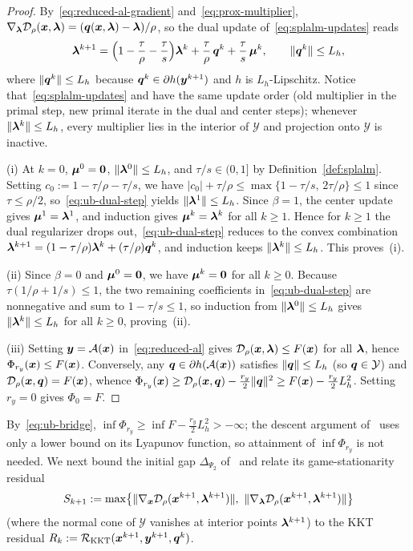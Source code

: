 \begin{proof}
By~\eqref{eq:reduced-al-gradient} and~\eqref{eq:prox-multiplier},
\(\nabla_{\bm{\lambda}}\mathcal{D}_\rho(\bm{x},\bm{\lambda})=(\bm{q}(\bm{x},\bm{\lambda})-\bm{\lambda})/\rho\), so
the dual update of~\eqref{eq:splalm-updates} reads
\begin{equation}
\bm{\lambda}^{k+1}
=\Bigl(1-\frac\tau\rho-\frac\tau s\Bigr)\bm{\lambda}^k
+\frac\tau\rho\,\bm{q}^k+\frac\tau s\,\bm{\mu}^k,
\qquad \|\bm{q}^k\|\le L_h,
\label{eq:ub-dual-step}
\end{equation}
where \(\|\bm{q}^k\|\le L_h\) because \(\bm{q}^k\in\partial h(\bm{y}^{k+1})\) and \(h\)
is \(L_h\)-Lipschitz. Notice that~\eqref{eq:splalm-updates} and
\cite[Algorithm~3]{li2026smoothing} have the same update order (old multiplier
in the primal step, new primal iterate in the dual and center steps); whenever
\(\|\bm{\lambda}^k\|\le L_h\), every multiplier lies in the interior of \(\mathcal Y\)
and projection onto \(\mathcal Y\) is inactive.

(i) At \(k=0\), \(\bm{\mu}^0=\bm{0}\), \(\|\bm{\lambda}^0\|\le L_h\), and
\(\tau/s\in(0,1]\) by Definition~\ref{def:splalm}. Setting
\(c_0:=1-\tau/\rho-\tau/s\), we have
\(|c_0|+\tau/\rho\le\max\{1-\tau/s,\,2\tau/\rho\}\le1\) since
\(\tau\le\rho/2\), so~\eqref{eq:ub-dual-step} yields \(\|\bm{\lambda}^1\|\le L_h\).
Since \(\beta=1\), the center update gives \(\bm{\mu}^1=\bm{\lambda}^1\), and induction
gives \(\bm{\mu}^k=\bm{\lambda}^k\) for all \(k\ge1\). Hence for \(k\ge1\) the dual
regularizer drops out,~\eqref{eq:ub-dual-step} reduces to the convex
combination \(\bm{\lambda}^{k+1}=(1-\tau/\rho)\bm{\lambda}^k+(\tau/\rho)\bm{q}^k\), and
induction keeps \(\|\bm{\lambda}^k\|\le L_h\). This proves~(i).

(ii) Since \(\beta=0\) and \(\bm{\mu}^0=\bm{0}\), we have \(\bm{\mu}^k=\bm{0}\) for all
\(k\ge0\). Because \(\tau(1/\rho+1/s)\le1\), the two remaining coefficients
in~\eqref{eq:ub-dual-step} are nonnegative and sum to \(1-\tau/s\le1\), so
induction from \(\|\bm{\lambda}^0\|\le L_h\) gives \(\|\bm{\lambda}^k\|\le L_h\) for all
\(k\ge0\), proving~(ii).

(iii) Setting \(\bm{y}=\mathcal{A}(\bm{x})\) in~\eqref{eq:reduced-al} gives
\(\mathcal{D}_\rho(\bm{x},\bm{\lambda})\le F(\bm{x})\) for all \(\bm{\lambda}\), hence
\(\Phi_{r_y}(\bm{x})\le F(\bm{x})\). Conversely, any \(\bm{q}\in\partial h(\mathcal{A}(\bm{x}))\)
satisfies \(\|\bm{q}\|\le L_h\) (so \(\bm{q}\in\mathcal Y\)) and
\(\mathcal{D}_\rho(\bm{x},\bm{q})=F(\bm{x})\), whence
\(\Phi_{r_y}(\bm{x})\ge\mathcal{D}_\rho(\bm{x},\bm{q})-\frac{r_y}{2}\|\bm{q}\|^2
\ge F(\bm{x})-\frac{r_y}{2}L_h^2\). Setting \(r_y=0\) gives \(\Phi_0=F\).
\end{proof}

By~\eqref{eq:ub-bridge}, \(\inf\Phi_{r_y}\ge\inf F-\frac{r_y}{2}L_h^2>-\infty\);
the descent argument of~\cite[Section~4]{li2026smoothing} uses only a lower
bound on its Lyapunov function, so attainment of \(\inf\Phi_{r_y}\) is not
needed. We next bound the initial gap \(\Delta_{\Psi_2}\)
of~\cite[Definition~3.1(ii)]{li2026smoothing} and relate its game-stationarity
residual
\[
S_{k+1}:=\max\bigl\{\|\nabla_{\bm{x}}\mathcal{D}_\rho(\bm{x}^{k+1},\bm{\lambda}^{k+1})\|,\
\|\nabla_{\bm{\lambda}}\mathcal{D}_\rho(\bm{x}^{k+1},\bm{\lambda}^{k+1})\|\bigr\}
\]
(where the normal cone of \(\mathcal Y\) vanishes at interior points
\(\bm{\lambda}^{k+1}\)) to the KKT residual
\(R_k:=\mathcal R_{\mathrm{KKT}}(\bm{x}^{k+1},\bm{y}^{k+1},\bm{q}^k)\).


